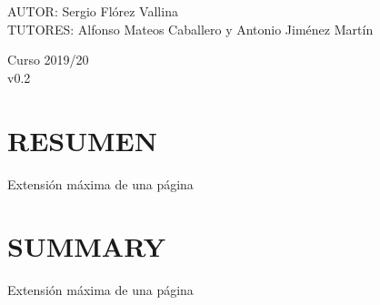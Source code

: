 \documentclass[spanish,12pt, a4paper,twoside]{article}
\let\oldsection\section
\def\section{\cleardoublepage\oldsection}
\newcommand\blankpage{
    \null
    \thispagestyle{empty}
    \addtocounter{page}{-1}
    \newpage
}
\begin{document}
\begin{titlepage}
        \begin{flushright}
            \large
            AUTOR: Sergio Flórez Vallina\\
            TUTORES: Alfonso Mateos Caballero y \linebreak
            Antonio Jiménez Martín
        \end{flushright}

        \vspace{1.3cm}

        { 
        	{Curso 2019/20}\\[0.3cm]
        	{v0.2}
    	}\\[3cm]
        

        \vfill

    \end{titlepage}

    \afterpage{\blankpage}


    \section*{RESUMEN}
    Extensión máxima de una página


    \section*{SUMMARY}
    Extensión máxima de una página


    \tableofcontents %



    \listoffigures

    \listoftables
    
    \listofalgorithms
	\afterpage{\blankpage}
	
    \newpage
	
\end{document}
